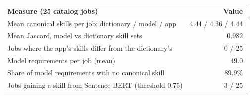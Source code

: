 \begin{tabular}{l r}
\hline
Measure (25 catalog jobs) & Value \\
\hline
Mean canonical skills per job: dictionary / model / app & 4.44 / 4.36 / 4.44 \\
Mean Jaccard, model vs dictionary skill sets & 0.982 \\
Jobs where the app's skills differ from the dictionary's & 0 / 25 \\
Model requirements per job (mean) & 49.0 \\
Share of model requirements with no canonical skill & 89.9\% \\
Jobs gaining a skill from Sentence-BERT (threshold 0.75) & 3 / 25 \\
\hline
\end{tabular}
